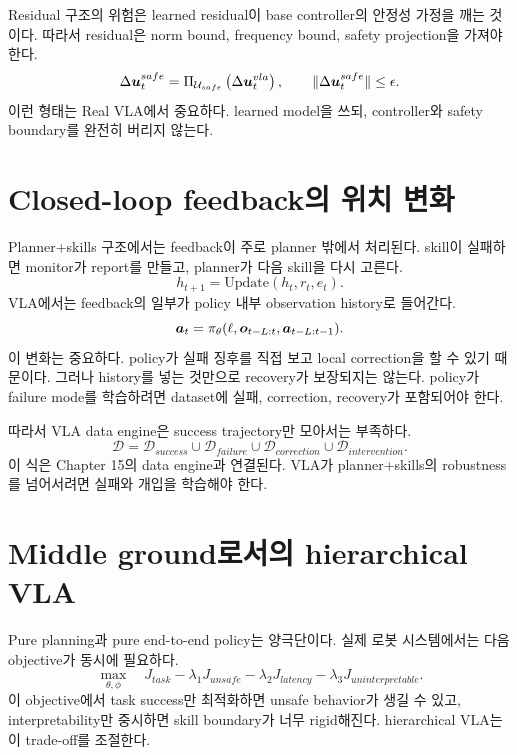 Residual 구조의 위험은 learned residual이 base controller의 안정성 가정을 깨는 것이다. 따라서 residual은 norm bound, frequency bound, safety projection을 가져야 한다.
\begin{equation}
  \Delta \bm{u}_t^{safe}
  =
  \Pi_{\mathcal{U}_{safe}}
  \left(\Delta \bm{u}_t^{vla}\right),
  \qquad
  \|\Delta \bm{u}_t^{safe}\| \leq \epsilon.
  \label{eq:residual-projection}
\end{equation}
이런 형태는 Real VLA에서 중요하다. learned model을 쓰되, controller와 safety boundary를 완전히 버리지 않는다.

\section{Closed-loop feedback의 위치 변화}

Planner+skills 구조에서는 feedback이 주로 planner 밖에서 처리된다. skill이 실패하면 monitor가 report를 만들고, planner가 다음 skill을 다시 고른다.
\begin{equation}
  h_{t+1}
  =
  \mathrm{Update}(h_t,r_t,e_t).
  \label{eq:external-feedback-update}
\end{equation}
VLA에서는 feedback의 일부가 policy 내부 observation history로 들어간다.
\begin{equation}
  \bm{a}_t
  =
  \pi_{\theta}(\ell,\bm{o}_{t-L:t},\bm{a}_{t-L:t-1}).
  \label{eq:vla-feedback-history}
\end{equation}
이 변화는 중요하다. policy가 실패 징후를 직접 보고 local correction을 할 수 있기 때문이다. 그러나 history를 넣는 것만으로 recovery가 보장되지는 않는다. policy가 failure mode를 학습하려면 dataset에 실패, correction, recovery가 포함되어야 한다.

따라서 VLA data engine은 success trajectory만 모아서는 부족하다.
\begin{equation}
  \mathcal{D}
  =
  \mathcal{D}_{success}
  \cup
  \mathcal{D}_{failure}
  \cup
  \mathcal{D}_{correction}
  \cup
  \mathcal{D}_{intervention}.
  \label{eq:vla-data-mixture}
\end{equation}
이 식은 Chapter 15의 data engine과 연결된다. VLA가 planner+skills의 robustness를 넘어서려면 실패와 개입을 학습해야 한다.

\section{Middle ground로서의 hierarchical VLA}

Pure planning과 pure end-to-end policy는 양극단이다. 실제 로봇 시스템에서는 다음 objective가 동시에 필요하다.
\begin{equation}
  \max_{\theta,\phi}
  \quad
  J_{task}
  -
  \lambda_1 J_{unsafe}
  -
  \lambda_2 J_{latency}
  -
  \lambda_3 J_{uninterpretable}.
  \label{eq:vla-system-objective}
\end{equation}
이 objective에서 task success만 최적화하면 unsafe behavior가 생길 수 있고, interpretability만 중시하면 skill boundary가 너무 rigid해진다. hierarchical VLA는 이 trade-off를 조절한다.

